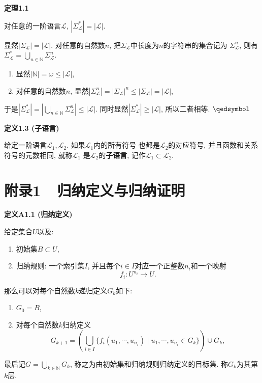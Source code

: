 \vspace{10pt}

\hypertarget{sec:定理1.1}{}
\noindent\textbf{定理1.1}

对任意的一阶语言$\mathcal{L}$, $|\Sigma_{\mathcal{L}}^*|=|\mathcal{L}|$.


显然$|\Sigma_{\mathcal{L}}|=|\mathcal{L}|$.
对任意的自然数$n$, 把$\Sigma_{\mathcal{L}}$中长度为$n$的字符串的集合记为
$\Sigma_{\mathcal{L}}^n$, 则有$\displaystyle\Sigma_{\mathcal{L}}^*=
\bigcup_{n\in\mathbb{N}}\Sigma_{\mathcal{L}}^n$.
\begin{enumerate}
    \item 显然$|\mathbb{N}|=\omega\leqslant|\mathcal{L}|$,
    \item 对任意的自然数$n$, 显然$|\Sigma_{\mathcal{L}}^n|=
    |\Sigma_{\mathcal{L}}|^n\leqslant|\Sigma_{\mathcal{L}}|=|\mathcal{L}|$,
\end{enumerate}
\vspace{3pt}
于是$\displaystyle|\Sigma_{\mathcal{L}}^*|=
\left|\bigcup_{n\in\mathbb{N}}\Sigma_{\mathcal{L}}^n\right|\leqslant|\mathcal{L}|$.
同时显然$|\Sigma_{\mathcal{L}}^*|\geqslant|\mathcal{L}|$, 所以二者相等.
\hfill $\qedsymbol$

\vspace{10pt}

\hypertarget{sec:定义1.3}{}
\noindent\textbf{定义1.3 (子语言)}

给定一阶语言$\mathcal{L}_1,\mathcal{L}_2$. 如果$\mathcal{L}_1$内的所有符号
也都是$\mathcal{L}_2$的对应符号, 并且函数和关系符号的元数相同, 就称$\mathcal{L}_1$
是$\mathcal{L}_2$的\textbf{子语言}, 记作$\mathcal{L}_1\subset\mathcal{L}_2$.





\newpage

\section*{附录1\ \ 归纳定义与归纳证明}

\hypertarget{sec:定义A1.1}{}
\noindent\textbf{定义A1.1 (归纳定义)}

给定集合$U$以及:
\begin{enumerate}
    \item 初始集$B\subset U$,
    \item 归纳规则: 一个索引集$I$, 并且每个$i\in I$对应一个正整数$n_i$和一个映射
    \[
        f_i:U^{n_i}\to U.
    \]
\end{enumerate}
那么可以对每个自然数$k$递归定义$G_k$如下:
\begin{enumerate}
    \item $G_0=B$,
    \item 对每个自然数$k$归纳定义
    \[
        G_{k+1}=\left(\bigcup_{i\in I}\{f_i(u_1,\cdots,u_{n_i})
        \mid u_1,\cdots,u_{n_i}\in G_k\}\right)\cup G_k,
    \]
\end{enumerate}
最后记$\displaystyle G=\bigcup_{k\in\mathbb{N}}G_k$,
称之为由初始集和归纳规则归纳定义的目标集. 称$G_k$为其第$k$层.


